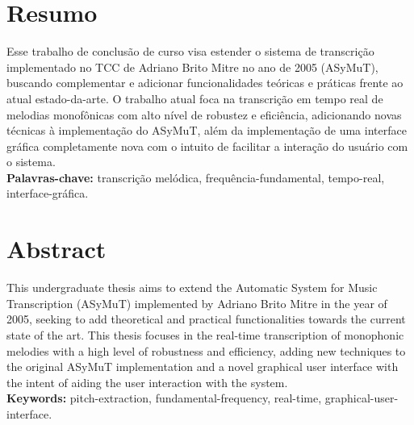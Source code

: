 \chapter*{Resumo}

Esse trabalho de conclusão de curso visa estender o sistema de transcrição implementado no TCC de Adriano Brito Mitre no ano de 2005 (ASyMuT), buscando complementar e adicionar funcionalidades teóricas e práticas frente ao atual estado-da-arte. O trabalho atual foca na transcrição em tempo real de melodias monofônicas com alto nível de robustez e eficiência, adicionando novas técnicas à implementação do ASyMuT, além da implementação de uma interface gráfica completamente nova com o intuito de facilitar a interação do usuário com o sistema.
\\

\noindent \textbf{Palavras-chave:} transcrição melódica, frequência-fundamental, tempo-real, interface-gráfica.

\chapter*{Abstract}

This undergraduate thesis aims to extend the Automatic System for Music Transcription (ASyMuT) implemented by Adriano Brito Mitre in the year of 2005, seeking to add theoretical and practical functionalities towards the current state of the art. This thesis focuses in the real-time transcription of monophonic melodies with a high level of robustness and efficiency, adding new techniques to the original ASyMuT implementation and a novel graphical user interface with the intent of aiding the user interaction with the system.
\\

\noindent \textbf{Keywords:} pitch-extraction, fundamental-frequency, real-time, graphical-user-interface.
